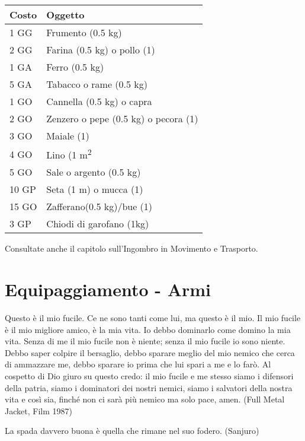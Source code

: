 \documentclass[12pt,a4paper,twoside,openany]{book}
\begin{document}
\begin{multicols}{2}
\begin{tabular}{ll}
\textbf{Costo} & \textbf{Oggetto}\\
\toprule
1 GG & Frumento (0.5 kg)\\
2 GG & Farina (0.5 kg) o pollo (1)\\
1 GA & Ferro (0.5 kg)\\
5 GA & Tabacco o rame (0.5 kg)\\
1 GO & Cannella (0.5 kg) o capra \\
2 GO & Zenzero o pepe (0.5 kg) o pecora (1)\\
3 GO & Maiale (1) \\
4 GO & Lino (1 m\textsuperscript{2}\\
5 GO & Sale o argento (0.5 kg) \\
10 GP& Seta (1 m) o mucca (1)\\
15 GO& Zafferano(0.5 kg)/bue (1)\\
3 GP&Chiodi di garofano (1kg)\\
\end{tabular}

\medskip

Consultate anche il capitolo sull'Ingombro in Movimento e Trasporto.

\end{multicols}

\pagebreak

\section{Equipaggiamento - Armi}\label{equipaggiamentoarmi}
\hypertarget{equipaggiamento.armi}{}

\label{equipaggiamento---armi}
\begin{changemargin}{0.3cm}{0.3cm}\begin{enfasi}{
Questo è il mio fucile. Ce ne sono tanti come lui, ma questo è il mio. Il mio fucile è il mio migliore amico, è la mia vita. Io debbo dominarlo come domino la mia vita. Senza di me il mio fucile non è niente; senza il mio fucile io sono niente. Debbo saper colpire il bersaglio, debbo sparare meglio del mio nemico che cerca di ammazzare me, debbo sparare io prima che lui spari a me e lo farò. Al cospetto di Dio giuro su questo credo: il mio fucile e me stesso siamo i difensori della patria, siamo i dominatori dei nostri nemici, siamo i salvatori della nostra vita e così sia, finché non ci sarà più nemico ma solo pace, amen. (Full Metal Jacket, Film 1987)

\medskip

La spada davvero buona è quella che rimane nel suo fodero. (Sanjuro)}\end{enfasi}\end{changemargin}
\end{document}
